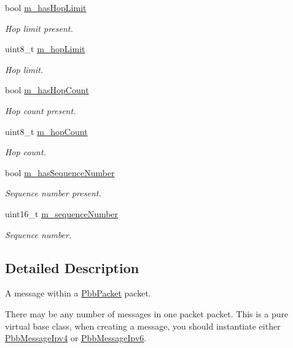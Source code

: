 \begin{DoxyCompactItemize}
bool \hyperlink{classns3_1_1PbbMessage_a1cb05b311d9c4795d1536878eadfe88b}{m\+\_\+has\+Hop\+Limit}
\begin{DoxyCompactList}\small\item\em Hop limit present. \end{DoxyCompactList}\item 
uint8\+\_\+t \hyperlink{classns3_1_1PbbMessage_a5d8a3495ddf861ec761139aa2a2e8d96}{m\+\_\+hop\+Limit}
\begin{DoxyCompactList}\small\item\em Hop limit. \end{DoxyCompactList}\item 
bool \hyperlink{classns3_1_1PbbMessage_a96849a9a82f3ace89fd1267a259bb476}{m\+\_\+has\+Hop\+Count}
\begin{DoxyCompactList}\small\item\em Hop count present. \end{DoxyCompactList}\item 
uint8\+\_\+t \hyperlink{classns3_1_1PbbMessage_ad38212959ec4763cbc4fdc23ab0a17ef}{m\+\_\+hop\+Count}
\begin{DoxyCompactList}\small\item\em Hop count. \end{DoxyCompactList}\item 
bool \hyperlink{classns3_1_1PbbMessage_ad8968487e915d6cb78ca315863d0eada}{m\+\_\+has\+Sequence\+Number}
\begin{DoxyCompactList}\small\item\em Sequence number present. \end{DoxyCompactList}\item 
uint16\+\_\+t \hyperlink{classns3_1_1PbbMessage_a0783da135968860d4c7e79d572355838}{m\+\_\+sequence\+Number}
\begin{DoxyCompactList}\small\item\em Sequence number. \end{DoxyCompactList}\end{DoxyCompactItemize}


\subsection{Detailed Description}
A message within a \hyperlink{classns3_1_1PbbPacket}{Pbb\+Packet} packet. 

There may be any number of messages in one packet packet. This is a pure virtual base class, when creating a message, you should instantiate either \hyperlink{classns3_1_1PbbMessageIpv4}{Pbb\+Message\+Ipv4} or \hyperlink{classns3_1_1PbbMessageIpv6}{Pbb\+Message\+Ipv6}. 

